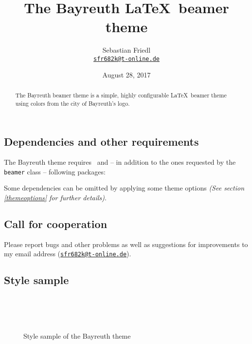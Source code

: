 \documentclass[11pt]{ltxdoc}
\title{The Bayreuth \LaTeX\ beamer theme}
\author{Sebastian Friedl \\ \href{mailto:sfr682k@t-online.de}{\texttt{sfr682k@t-online.de}}}
\date{August 28, 2017}
\begin{document}
	\maketitle
	\thispagestyle{empty}
	
	\medskip
	\begin{abstract}
		\hspace{-1.5em}%
		The Bayreuth beamer theme is a simple, highly configurable \LaTeX\ beamer theme using colors from the city of Bayreuth's logo.
	\end{abstract}
	

	\tableofcontents

	\clearpage

	
	
	\subsection*{Dependencies and other requirements}
	The Bayreuth theme requires \LaTeXe\ and -- in addition to the ones requested by the \texttt{beamer} class -- following packages:
	

	\bigskip
	Some dependencies can be omitted by applying some theme options \textit{(See section \ref{themeoptions} for further details)}.
	
	
	\subsection*{Call for cooperation}
	Please report bugs and other problems as well as suggestions for improvements to my email address (\href{mailto:sfr682k@t-online.de}{\texttt{sfr682k@t-online.de}}).
	
	
	\subsection*{Style sample}
	\begin{figure} \centering
		~~~ \\[.5em]
		~~~ \\[.5em]
		~~~ \\[.5em]
		
		\caption{Style sample of the Bayreuth theme}
		\label{stylesample}
	\end{figure}
	
\end{document}
